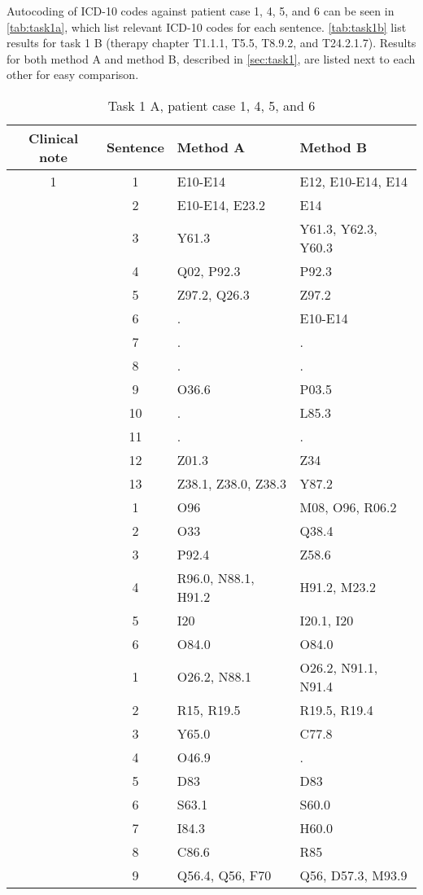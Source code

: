 Autocoding of ICD-10 codes against patient case 1, 4, 5, and 6 can be seen in
\autoref{tab:task1a}, which list relevant ICD-10 codes for each sentence.
\autoref{tab:task1b} list results for task 1 B (therapy chapter T1.1.1, T5.5,
T8.9.2, and T24.2.1.7). Results for both method A and method B, described in
\autoref{sec:task1}, are listed next to each other for easy comparison.
\begin{table}[htbp] \footnotesize \center
\caption{Task 1 A, patient case 1, 4, 5, and 6\label{tab:task1a}}
\begin{tabular}{c c l l}
    \toprule
    Clinical note & Sentence & Method A & Method B \\
    \midrule
	1 & 1 & E10-E14 & E12, E10-E14, E14 \\
	 & 2 & E10-E14, E23.2 & E14 \\
	 & 3 & Y61.3 & Y61.3, Y62.3, Y60.3 \\
	 & 4 & Q02, P92.3 & P92.3 \\
	 & 5 & Z97.2, Q26.3 & Z97.2 \\
	 & 6 & . & E10-E14 \\
	 & 7 & . & . \\
	 & 8 & . & . \\
	 & 9 & O36.6 & P03.5 \\
	 & 10 & . & L85.3 \\
	 & 11 & . & . \\
	 & 12 & Z01.3 & Z34 \\
	 & 13 & Z38.1, Z38.0, Z38.3 & Y87.2 \\
	\addlinespace
	4 & 1 & O96 & M08, O96, R06.2 \\
	 & 2 & O33 & Q38.4 \\
	 & 3 & P92.4 & Z58.6 \\
	 & 4 & R96.0, N88.1, H91.2 & H91.2, M23.2 \\
	 & 5 & I20 & I20.1, I20 \\
	 & 6 & O84.0 & O84.0 \\
	\addlinespace
	5 & 1 & O26.2, N88.1 & O26.2, N91.1, N91.4 \\
	 & 2 & R15, R19.5 & R19.5, R19.4 \\
	 & 3 & Y65.0 & C77.8 \\
	 & 4 & O46.9 & . \\
	 & 5 & D83 & D83 \\
	 & 6 & S63.1 & S60.0 \\
	 & 7 & I84.3 & H60.0 \\
	 & 8 & C86.6 & R85 \\
	 & 9 & Q56.4, Q56, F70 & Q56, D57.3, M93.9 \\

\end{tabular}
\end{table}
